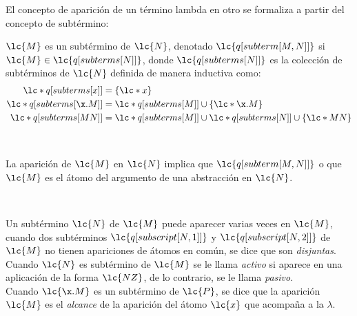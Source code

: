 El concepto de aparición de un término lambda en otro se formaliza a partir del concepto de subtérmino: \\

\begin{defi}[Subtérmino] \(\lc{M}\) es un subtérmino de \(\lc{N}\), denotado \(\lc{q[subterm[M,N]]}\) si \(\lc{M} \in \lc{q[subterms[N]]}\), donde \(\lc{q[subterms[N]]}\) es la colección de subtérminos de \(\lc{N}\) definida de manera inductiva como:
  \label{definicion:subtermino}
  \begin{align*}
    \lc*{q[subterms[x]]} &= \{\lc*{x}\} \\
    \lc*{q[subterms[\x.M]]} &= \lc*{q[subterms[M]]} \cup \{\lc*{\x.M}\} \\
    \lc*{q[subterms[M N]]} &= \lc*{q[subterms[M]]} \cup \lc*{q[subterms[N]]} \cup \{\lc*{M N}\}
  \end{align*}
\end{defi} \

\begin{defi}[Aparición] La aparición de \(\lc{M}\) en \(\lc{N}\) implica que \(\lc{q[subterm[M,N]]}\) o que \(\lc{M}\) es el átomo del argumento de una abstracción en \(\lc{N}\).
  \label{definicion:aparicion}
\end{defi} \

Un subtérmino \(\lc{N}\) de \(\lc{M}\) puede aparecer varias veces en \(\lc{M}\), cuando dos subtérminos \(\lc{q[subscript[N,1]]}\) y \(\lc{q[subscript[N,2]]}\) de \(\lc{M}\) no tienen apariciones de átomos en común, se dice que son \emph{disjuntas}. Cuando \(\lc{N}\) es subtérmino de \(\lc{M}\) se le llama \emph{activo} si aparece en una aplicación de la forma \(\lc{N Z}\), de lo contrario, se le llama \emph{pasivo}. \\

Cuando \(\lc{\x.M}\) es un subtérmino de \(\lc{P}\), se dice que la aparición \(\lc{M}\) es el \emph{alcance} de la aparición del átomo \(\lc{x}\) que acompaña a la \(\lambda\). \\


